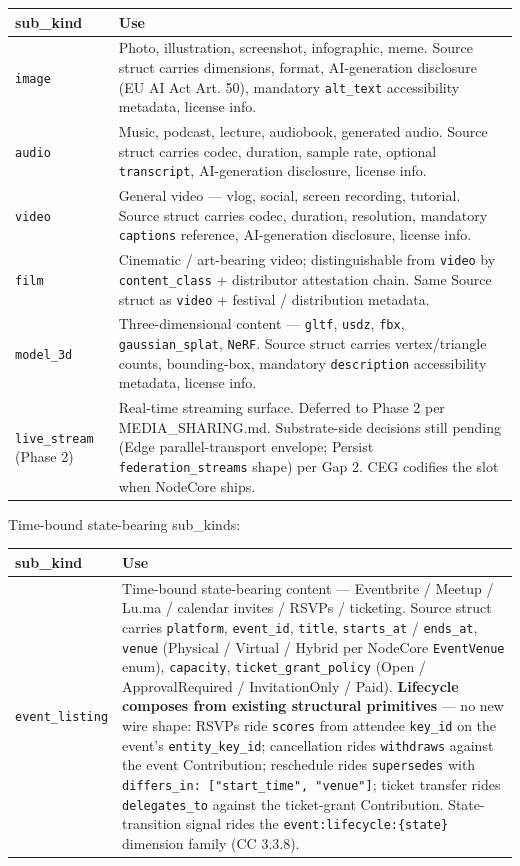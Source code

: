 \documentclass[11pt]{article}
\begin{document}
{\footnotesize
\begin{longtable}{|p{8.0cm}|p{8.0cm}|}\hline
\textbf{sub\_kind} & \textbf{Use} \\ \hline\endhead
\texttt{image} & Photo, illustration, screenshot, infographic, meme. Source struct carries dimensions, format, AI-generation disclosure (EU AI Act Art. 50), mandatory \texttt{alt\_text} accessibility metadata, license info. \\ \hline
\texttt{audio} & Music, podcast, lecture, audiobook, generated audio. Source struct carries codec, duration, sample rate, optional \texttt{transcript}, AI-generation disclosure, license info. \\ \hline
\texttt{video} & General video — vlog, social, screen recording, tutorial. Source struct carries codec, duration, resolution, mandatory \texttt{captions} reference, AI-generation disclosure, license info. \\ \hline
\texttt{film} & Cinematic / art-bearing video; distinguishable from \texttt{video} by \texttt{content\_class} + distributor attestation chain. Same Source struct as \texttt{video} + festival / distribution metadata. \\ \hline
\texttt{model\_3d} & Three-dimensional content — \texttt{gltf}, \texttt{usdz}, \texttt{fbx}, \texttt{gaussian\_splat}, \texttt{NeRF}. Source struct carries vertex/triangle counts, bounding-box, mandatory \texttt{description} accessibility metadata, license info. \\ \hline
\texttt{live\_stream} (Phase 2) & Real-time streaming surface. Deferred to Phase 2 per MEDIA\_SHARING.md. Substrate-side decisions still pending (Edge parallel-transport envelope; Persist \texttt{federation\_streams} shape) per Gap 2. CEG codifies the slot when NodeCore ships. \\ \hline
\end{longtable}}


Time-bound state-bearing sub\_kinds:


{\footnotesize
\begin{longtable}{|p{8.0cm}|p{8.0cm}|}\hline
\textbf{sub\_kind} & \textbf{Use} \\ \hline\endhead
\texttt{event\_listing} & Time-bound state-bearing content — Eventbrite / Meetup / Lu.ma / calendar invites / RSVPs / ticketing. Source struct carries \texttt{platform}, \texttt{event\_id}, \texttt{title}, \texttt{starts\_at} / \texttt{ends\_at}, \texttt{venue} (Physical / Virtual / Hybrid per NodeCore \texttt{EventVenue} enum), \texttt{capacity}, \texttt{ticket\_grant\_policy} (Open / ApprovalRequired / InvitationOnly / Paid). \textbf{Lifecycle composes from existing structural primitives} — no new wire shape: RSVPs ride \texttt{scores} from attendee \texttt{key\_id} on the event's \texttt{entity\_key\_id}; cancellation rides \texttt{withdraws} against the event Contribution; reschedule rides \texttt{supersedes} with \texttt{differs\_in: ["start\_time", "venue"]}; ticket transfer rides \texttt{delegates\_to} against the ticket-grant Contribution. State-transition signal rides the \texttt{event:lifecycle:\{state\}} dimension family (CC 3.3.8). \\ \hline
\end{longtable}}
\end{document}
